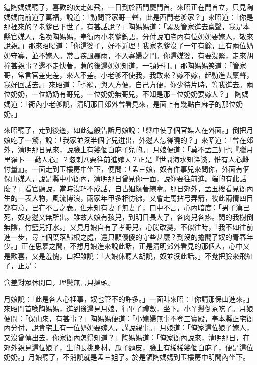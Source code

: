 \begin{showcontents}{}
這陶媽媽聽了，喜歡的疾走如飛，一日到於西門慶門首。來昭正在門首立，只見陶媽媽向前道了萬福，說道：「動問管家哥一聲，此是西門老爹家？」來昭道：「你是那裡來的？老爹已下世了，有甚話說？」陶媽媽道：「累及管家進去稟聲，我是本縣官媒人，名喚陶媽媽，奉衙內小老爹鈞語，分付說咱宅內有位奶奶要嫁人，敬來說親。」那來昭喝道：「你這婆子，好不近理！我家老爹沒了一年有餘，止有兩位奶奶守寡，並不嫁人。常言疾風暴雨，不入寡婦之門。你這媒婆，有要沒緊，走來胡撞甚親事？還不走快著，惹的後邊奶奶知道，一頓好打。」那陶媽媽笑道：「管家哥，常言官差吏差，來人不差。小老爹不使我，我敢來？嫁不嫁，起動進去稟聲，我好回話去。」來昭道：「也罷，與人方便，自己方便，你少待片時，等我進去。兩位奶奶，一位奶奶有哥兒，一位奶奶無哥兒，不知是那一位奶奶要嫁人？」 陶媽媽道：「衙內小老爹說，清明那日郊外曾看見來，是面上有幾點白麻子的那位奶奶。」

來昭聽了，走到後邊，如此這般告訴月娘說：「縣中使了個官媒人在外面。」倒把月娘吃了一驚，說：「我家並沒半個字兒迸出，外邊人怎得曉的？」來昭道：「曾在郊外，清明那日見來，說臉上有幾個白麻子兒的。」月娘便道：「莫不孟三姐也『臘月里羅卜──動人心』？忽剌八要往前進嫁人？正是『世間海水知深淺，惟有人心難忖量』」。一面走到玉樓房中坐下，便問：「孟三娘，奴有件事兒來問你，外面有個保山媒人，說是縣中小衙內，清明那日曾見你一面，說你要往前進。端的有此話麼？」看官聽說，當時沒巧不成話，自古姻緣著線牽。那日郊外，孟玉樓看見衙內生的一表人物，風流博浪，兩家年甲多相彷彿，又會走馬拈弓弄箭，彼此兩情四目都有意，已在不言之表。但未知有妻子無妻子，口中不言，心內暗度：「男子漢已死，奴身邊又無所出。雖故大娘有孩兒，到明日長大了，各肉兒各疼。閃的我樹倒無陰，竹籃兒打水。」又見月娘自有了孝哥兒，心腸改變，不似往時，「我不如往前進一步，尋上個葉落歸根之處，還只顧傻傻的守些甚麼？到沒的擔閣了奴的青春年少。」正在思慕之間，不想月娘進來說此話，正是清明郊外看見的那個人，心中又是歡喜，又是羞愧，口裡雖說：「大娘休聽人胡說，奴並沒此話。」不覺把臉來飛紅了，正是：

含羞對眾休開口，理鬢無言只搵頭。

月娘說：「此是各人心裡事，奴也管不的許多。」一面叫來昭：「你請那保山進來。」來昭門首喚陶媽媽，進到後邊見月娘，行畢了禮數，坐下。小丫鬟倒茶吃了。月娘便問：「保山來，有甚事？」陶媽媽便道：「小媳婦無事不登三寶殿，奉本縣正宅衙內分付，說貴宅上有一位奶奶要嫁人，講說親事。」月娘道：「俺家這位娘子嫁人，又沒曾傳出去，你家衙內怎得知道？」陶媽媽道：「俺家衙內說來，清明那日，在郊外親見這位娘子，生的長挑身材，瓜子麵皮，臉上有稀稀幾個白麻子，便是這位奶奶。」月娘聽了，不消說就是孟三姐了。於是領陶媽媽到玉樓房中明間內坐下。


\end{showcontents}
